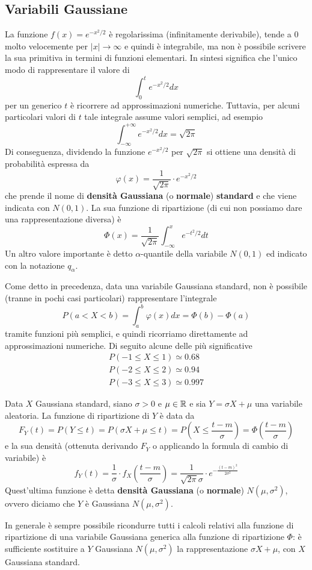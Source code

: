 \subsection{Variabili Gaussiane}
La funzione $f(x) = e^{-x^2 / 2}$ è regolarissima (infinitamente derivabile), tende a 0 molto
velocemente per $|x| \to \infty$ e quindi è integrabile, ma non è possibile scrivere la sua
primitiva in termini di funzioni elementari. In sintesi significa che l'unico modo di rappresentare
il valore di
\[ \int_0^t e^{-x^2 / 2} dx \]
per un generico $t$ è ricorrere ad approssimazioni numeriche. Tuttavia, per alcuni particolari
valori di $t$ tale integrale assume valori semplici, ad esempio
\[ \int_{-\infty}^{+\infty} e^{-x^2 / 2} dx = \sqrt{2 \pi} \]
Di conseguenza, dividendo la funzione $e^{-x^2/2}$ per $\sqrt{2 \pi}$ si ottiene una densità di
probabilità espressa da
\[ \varphi (x) = \frac{1}{\sqrt{2 \pi}} \cdot e^{-x^2 / 2} \]
che prende il nome di \textbf{densità Gaussiana} (o \textbf{normale}) \textbf{standard} e che viene
indicata con $N(0,1)$. La sua funzione di ripartizione (di cui non possiamo dare una
rappresentazione diversa) è
\[ \Phi(x) = \frac{1}{\sqrt{2 \pi}} \int_{-\infty}^x e^{-t^2 / 2} dt \]
Un altro valore importante è detto $\alpha$-quantile della variabile $N(0,1)$ ed indicato con la
notazione $q_\alpha$.

Come detto in precedenza, data una variabile Gaussiana standard, non è possibile (tranne in pochi
casi particolari) rappresentare l'integrale
\[ P(a < X < b) = \int_a^b \varphi(x) dx = \Phi(b) - \Phi(a) \]
tramite funzioni più semplici, e quindi ricorriamo direttamente ad approssimazioni numeriche. Di
seguito alcune delle più significative
\begin{gather*}
	P(-1 \leq X \leq 1) \simeq 0.68 \\
	P(-2 \leq X \leq 2) \simeq 0.94 \\
	P(-3 \leq X \leq 3) \simeq 0.997
\end{gather*}

Data $X$ Gaussiana standard, siano $\sigma > 0$ e $\mu \in \mathbb{R}$ e sia $Y = \sigma X + \mu$ una
variabile aleatoria. La funzione di ripartizione di $Y$ è data da
\[
	F_Y(t) = P(Y \leq t) = P(\sigma X + \mu \leq t) = P\left(X \leq \frac{t-m}{\sigma}\right) =
	\Phi \left(\frac{t-m}{\sigma}\right)
\]
e la sua densità (ottenuta derivando $F_Y$ o applicando la formula di cambio di variabile) è
\[
	f_Y(t) = \frac{1}{\sigma} \cdot f_X\left(\frac{t-m}{ \sigma}\right) =
	\frac{1}{\sqrt{2 \pi} \sigma} \cdot e^{-\frac{(t-m)^2}{2 \sigma^2}}
\]
Quest'ultima funzione è detta \textbf{densità Gaussiana} (o \textbf{normale}) $N(\mu, \sigma^2)$,
ovvero diciamo che $Y$ è Gaussiana $N(\mu, \sigma^2)$.

In generale è sempre possibile ricondurre tutti i calcoli relativi alla funzione di ripartizione
di una variabile Gaussiana generica alla funzione di ripartizione $\Phi$: è sufficiente sostituire
a $Y$ Gaussiana $N(\mu, \sigma^2)$ la rappresentazione $\sigma X + \mu$, con $X$ Gaussiana
standard.